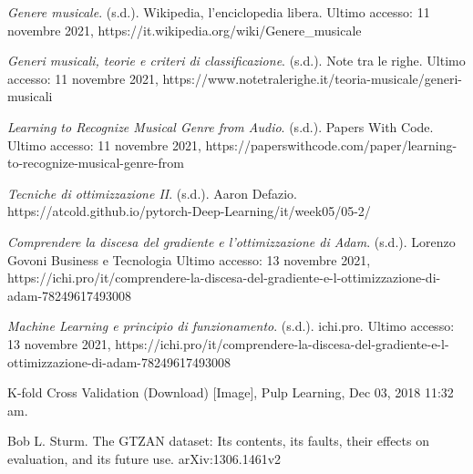 \documentclass[12pt,a4paper]{book}
\begin{document}
    
    \begin{thebibliography}{100}  %
    
     \textit{Genere musicale}. (s.d.). Wikipedia, l'enciclopedia libera. Ultimo accesso: 11 novembre 2021, https://it.wikipedia.org/wiki/Genere\_musicale
    
     \textit{Generi musicali, teorie e criteri di classificazione}. (s.d.). Note tra le righe. Ultimo accesso: 11 novembre 2021, https://www.notetralerighe.it/teoria-musicale/generi-musicali
    
     \textit{Learning to Recognize Musical Genre from Audio}. (s.d.). Papers With Code. Ultimo accesso: 11 novembre 2021, https://paperswithcode.com/paper/learning-to-recognize-musical-genre-from
    
     \textit{Tecniche di ottimizzazione II}. (s.d.). Aaron Defazio. https://atcold.github.io/pytorch-Deep-Learning/it/week05/05-2/
    
     \textit{Comprendere la discesa del gradiente e l'ottimizzazione di Adam}. (s.d.). Lorenzo Govoni Business e Tecnologia Ultimo accesso: 13 novembre 2021, https://ichi.pro/it/comprendere-la-discesa-del-gradiente-e-l-ottimizzazione-di-adam-78249617493008
    
     \textit{Machine Learning e principio di funzionamento}. (s.d.). ichi.pro. Ultimo accesso: 13 novembre 2021, https://ichi.pro/it/comprendere-la-discesa-del-gradiente-e-l-ottimizzazione-di-adam-78249617493008
    
     K-fold Cross Validation (Download) [Image], Pulp Learning, Dec 03, 2018 11:32 am.
    
     Bob L. Sturm. The GTZAN dataset: Its contents, its faults, their effects on evaluation, and its future use. arXiv:1306.1461v2

	\end{thebibliography}
\end{document}
